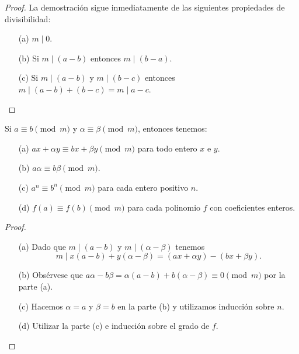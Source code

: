 \documentclass[12pt,a4paper]{book}
\begin{document}
    \begin{proof}
        La demostración sigue inmediatamente de las siguientes propiedades de
        divisibilidad:
        \begin{enumerate}
            \item[(a)] $m\mid0$.
            \item[(b)] Si $m\mid(a-b)$ entonces $m\mid(b-a)$.
            \item[(c)] Si $m\mid(a-b)$ y $m\mid(b-c)$ entonces
            $m\mid(a-b)+(b-c)=m\mid a-c$.
        \end{enumerate}
    \end{proof}

    \begin{teorema}
        Si $a\equiv b\pmod{m}$ y $\alpha\equiv\beta\pmod{m}$, entonces tenemos:
        \begin{enumerate}
            \item[(a)] $ax+\alpha y\equiv bx+\beta y\pmod{m}$ para todo entero $x$ e $y$.
            \item[(b)] $a\alpha\equiv b\beta\pmod{m}$.
            \item[(c)] $a^{n}\equiv b^{n}\pmod{m}$ para cada entero positivo $n$.
            \item[(d)] $f(a)\equiv f(b)\pmod{m}$ para cada polinomio $f$ con coeficientes
            enteros.
        \end{enumerate}
    \end{teorema}

    \begin{proof}
        \begin{enumerate}
            \item[(a)] Dado que $m\mid(a-b)$ y $m\mid(\alpha-\beta)$ tenemos
            \begin{equation*}
                m\mid x(a-b)+y(\alpha-\beta)=(ax+\alpha y)-(bx+\beta y).
            \end{equation*}
            \item[(b)] Obsérvese que $a\alpha-b\beta=\alpha(a-b)+b(\alpha-\beta)\equiv0\pmod{m}$
            por la parte (a).
            \item[(c)] Hacemos $\alpha=a$ y $\beta=b$ en la parte (b) y utilizamos inducción
            sobre $n$.
            \item[(d)] Utilizar la parte (c) e inducción sobre el grado de $f$.
        \end{enumerate}
    \end{proof}
\end{document}

